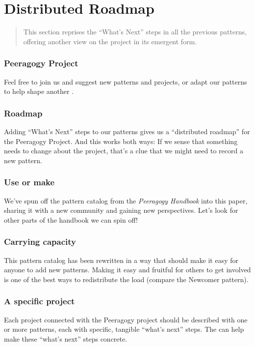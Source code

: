 \section{Distributed Roadmap} \label{sec:Distributed_Roadmap}

\begin{quote}
This section reprises the ``What's Next'' steps in all the previous
patterns, offering another view on the project 
in its emergent form.
\end{quote}

\subsubsection*{Peeragogy Project} Feel free to join us and suggest new patterns and projects, or adapt our patterns to help shape another .

\subsubsection*{Roadmap} Adding ``What's Next'' steps to our patterns gives us a ``distributed roadmap'' for the Peeragogy Project.  And this works both ways:   If we sense that something needs to change about the project, that's a clue that we might need to record a new pattern.

\subsubsection*{Use or make} 
We've spun off the pattern catalog from the \emph{Peeragogy Handbook} into this paper, sharing it with a new community and gaining new perspectives.  Let's look for other parts of the handbook we can spin off!

\subsubsection*{Carrying capacity} This pattern catalog has been rewritten in a way that should make it
easy for anyone to add new patterns. Making it easy and fruitful for
others to get involved is one of the best ways to redistribute the load
(compare the Newcomer pattern).

\subsubsection*{A specific project} 
 Each project connected with the Peeragogy project should be described with one or more patterns, each with specific, tangible ``what's next'' steps.  The  can help make these ``what's next'' steps concrete.

